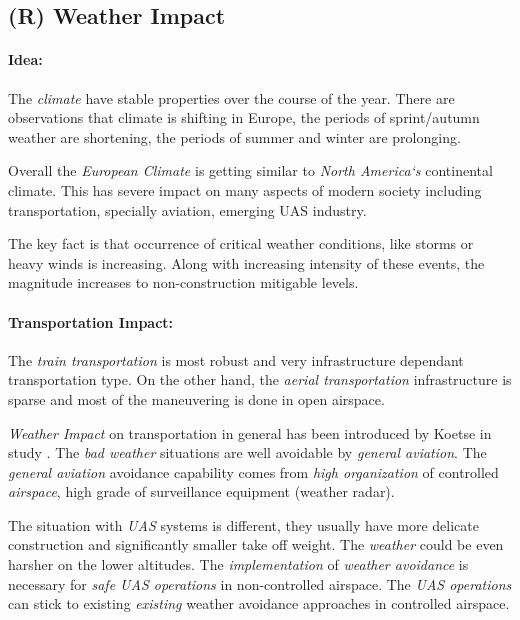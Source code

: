 \subsection{(R) Weather Impact}\label{sec:WeatherImpact}

\paragraph{Idea:} The \emph{climate} have stable properties over the course of the year. There are observations that climate is shifting in Europe, the periods of sprint/autumn weather are shortening, the periods of summer and winter are prolonging. 

Overall the \emph{European Climate} is getting similar to \emph{North America`s} continental climate. This has severe impact on many aspects of modern society including transportation, specially aviation, emerging UAS industry. 

The key fact is that occurrence of critical weather conditions, like storms or heavy winds is increasing. Along with increasing intensity of these events, the magnitude increases to non-construction mitigable levels.

\paragraph{Transportation Impact:} The \emph{train transportation} is most robust and very infrastructure dependant transportation type. On the other hand, the \emph{aerial transportation} infrastructure is sparse and most of the maneuvering is done in open airspace. 

\emph{Weather Impact} on transportation in general has been introduced by Koetse in study \cite{koetse2009impact}. The \emph{bad weather} situations are well avoidable by \emph{general aviation}. The \emph{general aviation} avoidance capability comes from \emph{high organization} of controlled \emph{airspace}, high grade of surveillance equipment (weather radar).

The situation with \emph{UAS} systems is different, they usually have more delicate construction and significantly smaller take off weight. The \emph{weather} could be even harsher on the lower altitudes. The \emph{implementation} of \emph{weather avoidance} is necessary for \emph{safe UAS operations} in non-controlled airspace. The \emph{UAS operations} can stick to existing \emph{existing} weather avoidance approaches in controlled airspace. 

